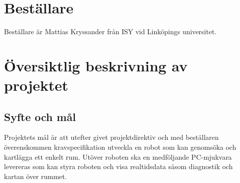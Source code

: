 \documentclass[a4paper,11pt]{article}
\begin{document}
\pagestyle{intro}
\LIPStitelsida
\clearpage
\begin{LIPSprojektidentitet}
\end{LIPSprojektidentitet}
\clearpage
\renewcommand{\familydefault}{\sfdefault}	%
\normalfont
\tableofcontents
\renewcommand{\familydefault}{\rmdefault}	%
\normalfont
\clearpage
\begin{LIPSdokumenthistorik}
\end{LIPSdokumenthistorik}
\clearpage
\setcounter{page}{1}
\pagestyle{content}
\section{Beställare}
Beställare är Mattias Kryssander från ISY vid Linköpings universitet.

\section{Översiktlig beskrivning av projektet}
\subsection{Syfte och mål}
Projektets mål är att utefter givet projektdirektiv och med beställaren överenskommen kravspecifikation utveckla en robot som kan genomsöka och kartlägga ett enkelt rum. Utöver roboten ska en medföljande PC-mjukvara levereras som kan styra roboten och visa realtidsdata såsom diagnostik och kartan över rummet.
\end{document}
